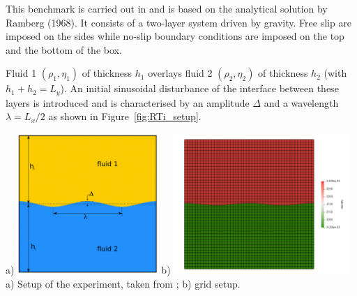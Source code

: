 
This benchmark is carried out in \cite{deka08,gery10,thie11} and is 
based on the analytical solution by Ramberg (1968). 
It consists of a two-layer system driven by gravity. 
Free slip are imposed on the sides while no-slip boundary conditions are imposed on the
top and the bottom of the box.

Fluid 1 $(\rho_1,\eta_1)$ of thickness $h_1$ overlays 
fluid 2 $(\rho_2,\eta_2)$ of thickness $h_2$ (with $h_1+h_2=L_y$).
An initial sinusoidal disturbance of the interface between these
layers is introduced and is characterised by an amplitude $\Delta$ and a
wavelength $\lambda=L_x/2$ as shown in Figure~\ref{fig:RTi_setup}.

\begin{center}
a) \includegraphics[width=0.4\textwidth]{python_codes/fieldstone_40/setup}
b) \includegraphics[width=0.5\textwidth]{python_codes/fieldstone_40/grid}\\
{\small  a) Setup of the experiment, taken from \cite{thie11}; b) grid setup.} 
\end{center}


